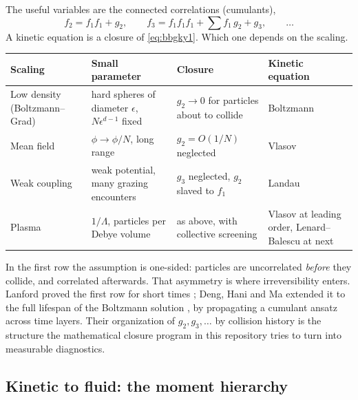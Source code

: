 The useful variables are the connected correlations (cumulants),
\[
  f_2 = f_1 f_1 + g_2, \qquad
  f_3 = f_1 f_1 f_1 + \textstyle\sum f_1\,g_2 + g_3, \qquad\dots
\]
A kinetic equation is a closure of \eqref{eq:bbgky1}. Which one depends on
the scaling.
\begin{center}
\renewcommand{\arraystretch}{1.25}
\begin{tabularx}{\textwidth}{@{}P{3.1cm}P{4.2cm}P{3.0cm}Y@{}}
\toprule
Scaling & Small parameter & Closure & Kinetic equation \\
\midrule
Low density (Boltzmann--Grad)
  & hard spheres of diameter $\epsilon$, $N\epsilon^{d-1}$ fixed
  & $g_2\to0$ for particles about to collide
  & Boltzmann \\
Mean field
  & $\phi\to\phi/N$, long range
  & $g_2 = O(1/N)$ neglected
  & Vlasov \\
Weak coupling
  & weak potential, many grazing encounters
  & $g_3$ neglected, $g_2$ slaved to $f_1$
  & Landau \\
Plasma
  & $1/\Lambda$, particles per Debye volume
  & as above, with collective screening
  & Vlasov at leading order, Lenard--Balescu at next \\
\bottomrule
\end{tabularx}
\end{center}
In the first row the assumption is one-sided: particles are uncorrelated
\emph{before} they collide, and correlated afterwards. That asymmetry is
where irreversibility enters. Lanford proved the first row for short times
\cite{Lanford75}; Deng, Hani and Ma extended it to the full lifespan of the
Boltzmann solution \cite{DHM24}, by propagating a cumulant ansatz across
time layers. Their organization of $g_2, g_3,\dots$ by collision history is
the structure the mathematical closure program in this repository tries to
turn into measurable diagnostics.

\subsection{Kinetic to fluid: the moment hierarchy}
\label{sec:momenthier}

